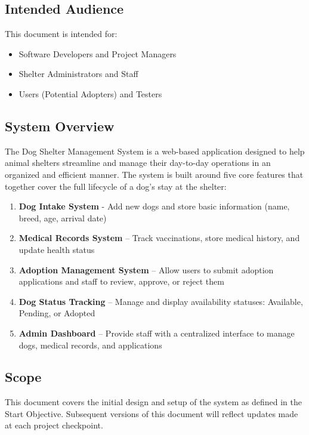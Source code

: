 \documentclass[12pt]{article}
\begin{document}
\subsection{Intended Audience}
This document is intended for:
\begin{itemize}
    \item Software Developers and Project Managers
    \item Shelter Administrators and Staff
    \item Users (Potential Adopters) and Testers
\end{itemize}
 
\subsection{System Overview}
The Dog Shelter Management System is a web-based application designed to help animal shelters streamline and manage their day-to-day operations in an organized and efficient manner. The system is built around five core features that together cover the full lifecycle of a dog's stay at the shelter:
 
\begin{enumerate}
    \item \textbf{Dog Intake System} - Add new dogs and store basic information (name, breed, age, arrival date)
    \item \textbf{Medical Records System} -- Track vaccinations, store medical history, and update health status
    \item \textbf{Adoption Management System} -- Allow users to submit adoption applications and staff to review, approve, or reject them
    \item \textbf{Dog Status Tracking} -- Manage and display availability statuses: Available, Pending, or Adopted
    \item \textbf{Admin Dashboard} -- Provide staff with a centralized interface to manage dogs, medical records, and applications
\end{enumerate}
 
\subsection{Scope}
This document covers the initial design and setup of the system as defined in the Start Objective.
Subsequent versions of this document will reflect updates made at each project checkpoint.

\end{document}
